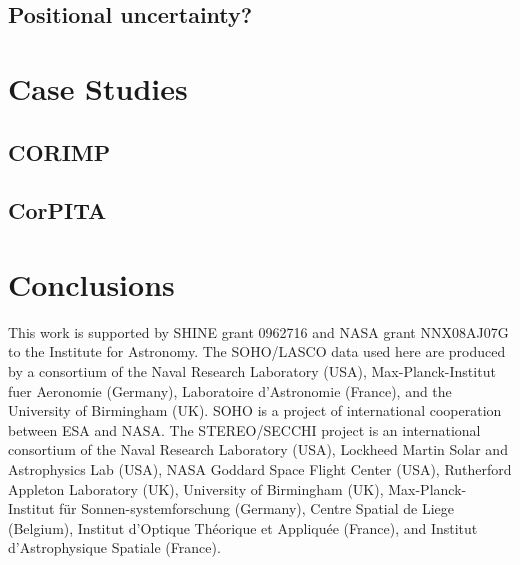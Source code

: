 \documentclass[structabstract]{aa}
\begin{document}
\subsection{Positional uncertainty?}
\label{subsect:pos_uncertainty}

\section{Case Studies}
\label{sect:case_studies}

\subsection{CORIMP}
\label{subsect:corimp}

\subsection{CorPITA}
\label{subsect:corpita}

\section{Conclusions}
\label{sect_conclusions}


\begin{acknowledgements}
This work is supported by SHINE grant 0962716 and NASA grant NNX08AJ07G to the Institute for Astronomy. The SOHO/LASCO data used here are produced by a consortium of the Naval Research Laboratory (USA), Max-Planck-Institut fuer Aeronomie (Germany), Laboratoire d'Astronomie (France), and the University of Birmingham (UK). SOHO is a project of international cooperation between ESA and NASA. The STEREO/SECCHI project is an international consortium of the Naval Research Laboratory (USA), Lockheed Martin Solar and Astrophysics Lab (USA), NASA Goddard Space Flight Center (USA), Rutherford Appleton Laboratory (UK), University of Birmingham (UK), Max-Planck-Institut f\"{u}r Sonnen-systemforschung (Germany), Centre Spatial de Liege (Belgium), Institut d'Optique Th\'{e}orique et Appliqu\'{e}e (France), and Institut d'Astrophysique Spatiale (France). 
\end{acknowledgements}
\end{document}
